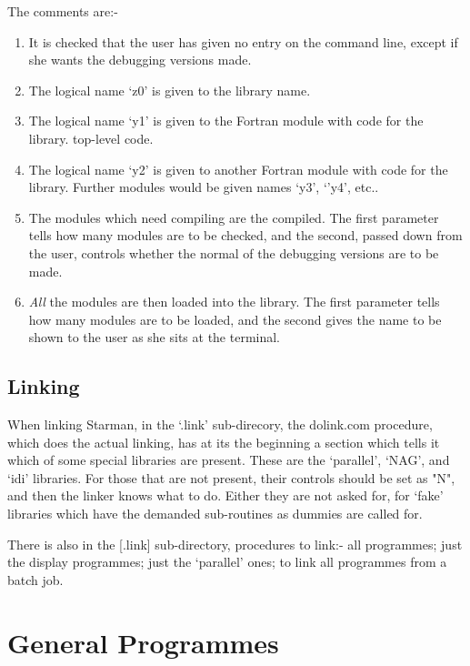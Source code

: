 The comments are:-

\begin{enumerate}
\item It is checked that the user has given no entry on the command line,
      except if she wants the debugging versions made.
\item The logical name `z0' is given to the library name.
\item The logical name `y1' is given to the Fortran module with code for the library.
      top-level code.
\item The logical name `y2' is given to another Fortran module with code
      for the library. Further modules would be given names `y3', `'y4', 
      etc.. 
\item The modules which need compiling are the compiled. The first 
      parameter tells how many modules are to be checked, and the
      second, passed down from the user, controls whether the
      normal of the debugging versions are to be made.
\item {\em All} the modules are then loaded into the library. The first 
      parameter tells how many modules are to be loaded, and the
      second gives the name to be shown to the user as she sits at the
      terminal.
\end{enumerate}

\subsection{Linking}

When linking Starman, in the `.link' sub-direcory, the dolink.com 
procedure, which does the actual linking, has at its the beginning a section
which tells it which of some special libraries are present. These are
the `parallel', `NAG', and `idi' libraries. For those that are not
present, their controls should be set as "N", and then the linker knows 
what to do. Either they are not asked for, for `fake' libraries which
have the demanded sub-routines as dummies are called for.

There is also in the [.link] sub-directory, procedures to link:- all 
programmes; just the display programmes; just the `parallel' ones;
to link all programmes from a batch job.
  

\newpage
\section{General Programmes}
\label{se:progs}

